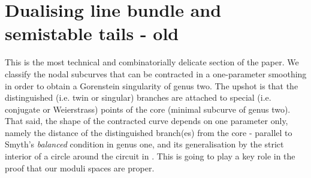 \documentclass[11pt]{amsart}
\theoremstyle{plain}
\theoremstyle{definition}
\begin{document}
\section{Dualising line bundle and semistable tails - old}
This is the most technical and combinatorially delicate section of the paper. We classify the nodal subcurves that can be contracted in a one-parameter smoothing in order to obtain a Gorenstein singularity of genus two. The upshot is that the distinguished (i.e. twin or singular) branches are attached to special (i.e. conjugate or Weierstrass) points of the core (minimal subcurve of genus two). That said, the shape of the contracted curve depends on one parameter only, namely the distance of the distinguished branch(es) from the core - parallel to Smyth's \emph{balanced} condition \cite[Definition 2.11]{SMY1} in genus one, and its generalisation by the strict interior of a circle around the circuit in \cite{RSPW1}. This is going to play a key role in the proof that our moduli spaces are proper.
\end{document}
